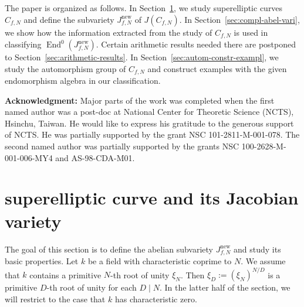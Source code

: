 \documentclass{amsart}[11pt]
\theoremstyle{definition}
\numberwithin{equation}{section}
\theoremstyle{notitle}
\begin{document}
The paper is organized as follows. In
Section~\ref{sec:superelliptic-curves}, we study superelliptic curves
$C_{f,N}$ and define the subvariety $J_{f,N}^{\mathrm{new}}$ of $J(C_{f,N})$. In
Section~\ref{sec:compl-abel-vari}, we show how the information
extracted from the study of $C_{f,N}$ is used in classifying
$\operatorname{End}^0(J_{f,N}^{\mathrm{new}})$. Certain arithmetic results needed there are
postponed to Section~\ref{sec:arithmetic-results}. In
Section~\ref{sec:autom-constr-exampl}, we study the automorphism group
of $C_{f,N}$ and construct examples with the given endomorphism
algebra in our classification.

\textbf{Acknowledgment:} Major parts of the work was completed when
the first named author was a post-doc at National Center for Theoretic
Science (NCTS), Hsinchu, Taiwan. He would like to express his
gratitude to the generous support of NCTS. He was partially supported
by the grant NSC 101-2811-M-001-078.
The second named author was partially supported by the grants 
NSC 100-2628-M-001-006-MY4 and AS-98-CDA-M01.

\section{superelliptic curve and its
  Jacobian variety}\label{sec:superelliptic-curves}

The goal of this section is to define the abelian subvariety
$J_{f,N}^{\mathrm{new}}$ and study its basic properties. Let $k$ be a field with
characteristic coprime to $N$.  We assume that $k$ contains a
primitive $N$-th root of unity $\xi_N$. Then $\xi_D:=(\xi_N)^{N/D}$ is
a primitive $D$-th root of unity for each $D\mid N$. In the latter
half of the section, we will restrict to the case that $k$ has
characteristic zero.
\end{document}
